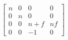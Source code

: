 $$
\begin{bmatrix}
  n & 0 & 0 & 0 \\
  0 & n & 0 & 0 \\
  0 & 0 & n + f & nf \\
  0 & 0 & -1 & 0
\end{bmatrix}
$$